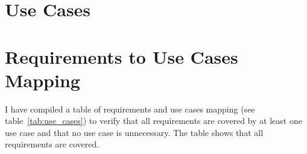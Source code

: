 \section{Use Cases}





\section{Requirements to Use Cases Mapping}
I have compiled a table of requirements and use cases mapping (see table~\ref{tab:use_cases}) to verify that all requirements are covered by at least one use case and that no use case is unnecessary.
The table shows that all requirements are covered.

